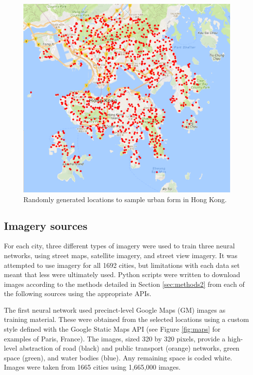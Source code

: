 \documentclass[final,3p,times,authoryear]{elsarticle}
\begin{document}
\begin{figure}[!htbp] 
    \centering    
\includegraphics[scale=1]{Images/HongKong.png} 
\caption{Randomly generated locations to sample urban form in Hong Kong.} 
\label{fig:hongkong}  
\end{figure}


\subsection{Imagery sources}\label{sec:methods3}

For each city, three different types of imagery were used to train three neural networks, using street maps, satellite imagery, and street view imagery. It was attempted to use imagery for all 1692 cities, but limitations with each data set meant that less were ultimately used. Python scripts were written to download images according to the methods detailed in Section \ref{sec:methods2} from each of the following sources using the appropriate APIs.

The first neural network used precinct-level Google Maps (GM) images as training material. These were obtained from the selected locations using a custom style defined with the Google Static Maps API \citep{GoogleStatic2017} (see Figure \ref{fig:maps} for examples of Paris, France). The images, sized 320 by 320 pixels, provide a high-level abstraction of road (black) and public transport (orange) networks, green space (green), and water bodies (blue). Any remaining space is coded white. Images were taken from 1665 cities using 1,665,000 images. 
\end{document}
